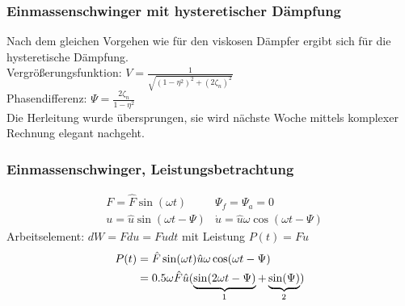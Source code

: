 \begin{frame}
        \frametitle{Einmassenschwinger mit hysteretischer Dämpfung} 
        Nach dem gleichen Vorgehen wie für den viskosen Dämpfer ergibt sich für die hysteretische Dämpfung. \\
        Vergrößerungsfunktion: $V = \frac{1}{\sqrt{(1 - \eta^2)^2 + (2\zeta_n)^2}}$ \\
        Phasendifferenz: $\Psi = \frac{2 \zeta_n}{1-\eta^2}$ \\
        Die Herleitung wurde übersprungen, sie wird nächste Woche mittels komplexer Rechnung elegant nachgeht. \vspace{0.5cm} \\
\end{frame}

\begin{frame}
\end{frame}

\begin{frame}
        \frametitle{Einmassenschwinger, Leistungsbetrachtung}
        \vspace{-0.8cm}
        \begin{align*}
                &F = \hat{F} \sin(\omega t) &\Psi_f = \Psi_a = 0 \\
                &u = \hat{u} \sin(\omega t - \Psi)  &\dot{u} = \hat{u} \omega \cos(\omega t - \Psi)   
        \end{align*} \vspace{-0.5cm}
        Arbeitselement: $dW = F du = F \dot{u} dt$ mit Leistung $P(t) = F \dot{u} $ \vspace{0.5cm}
        \begin{align*}
                P(t) &= \hat{F} \sin(\omega t) \hat{u} \omega \cos(\omega t - \Psi) \\
                &= 0.5 \omega \hat{F} \hat{u} (\underbrace{\sin(2\omega t - \Psi)}_{\footnotemark} + \underbrace{\sin(\Psi)}_{\footnotemark})
        \end{align*}  


\end{frame}

